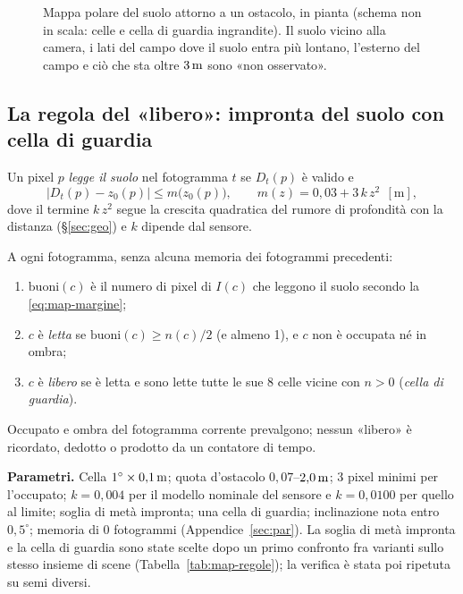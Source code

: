 \begin{figure}[H]
\caption{Mappa polare del suolo attorno a un ostacolo, in pianta (schema non in scala: celle e cella di guardia ingrandite). Il suolo vicino alla camera, i lati del campo dove il suolo entra più lontano, l'esterno del campo e ciò che sta oltre $3\,\mathrm{m}$ sono «non osservato».}\label{fig:map-polare}
\end{figure}

\subsection{La regola del «libero»: impronta del suolo con cella di guardia}\label{sec:map-regola}

Un pixel $p$ \emph{legge il suolo} nel fotogramma $t$ se $D_t(p)$ è valido e
\begin{equation}\label{eq:map-margine}
|D_t(p)-z_0(p)|\le m\big(z_0(p)\big),\qquad m(z)=0{,}03+3\,k\,z^2\ \ [\mathrm{m}],
\end{equation}
dove il termine $k\,z^2$ segue la crescita quadratica del rumore di profondità con la distanza (\S\ref{sec:geo}) e $k$ dipende dal sensore.

\begin{definizione}\label{def:map-libero}
A ogni fotogramma, senza alcuna memoria dei fotogrammi precedenti:
\begin{enumerate}
\item $\mathrm{buoni}(c)$ è il numero di pixel di $I(c)$ che leggono il suolo secondo la \eqref{eq:map-margine};
\item $c$ è \emph{letta} se $\mathrm{buoni}(c)\ge n(c)/2$ (e almeno 1), e $c$ non è occupata né in ombra;
\item $c$ è \emph{libero} se è letta e sono lette tutte le sue 8 celle vicine con $n>0$ (\emph{cella di guardia}).
\end{enumerate}
Occupato e ombra del fotogramma corrente prevalgono; nessun «libero» è ricordato, dedotto o prodotto da un contatore di tempo.
\end{definizione}

\textbf{Parametri.} Cella $1^\circ\times0{,}1\,\mathrm{m}$; quota d'ostacolo $0{,}07$–$2{,}0\,\mathrm{m}$; 3 pixel minimi per l'occupato; $k=0{,}004$ per il modello nominale del sensore e $k=0{,}0100$ per quello al limite; soglia di metà impronta; una cella di guardia; inclinazione nota entro $0{,}5^\circ$; memoria di 0 fotogrammi (Appendice~\ref{sec:par}). La soglia di metà impronta e la cella di guardia sono state scelte dopo un primo confronto fra varianti sullo stesso insieme di scene (Tabella~\ref{tab:map-regole}); la verifica è stata poi ripetuta su semi diversi.

